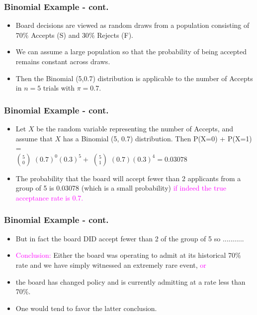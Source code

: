\documentclass[xcolor=dvipsnames,12pt]{beamer}
\begin{document}
\begin{frame}
\frametitle{Binomial Example - cont.}
\begin{itemize}
\item Board decisions are viewed as random draws from a
population consisting of $70\%$ Accepts (S) and $30\%$ Rejects (F).
\item We can assume a large population so that the probability of being
accepted remains constant across draws. 
\item Then the Binomial (5,0.7)
distribution is applicable to the number of Accepts in
$n=5$ trials with $\pi=0.7$.
\end{itemize}
\end{frame}


\begin{frame}
\frametitle{Binomial Example - cont.}
\begin{itemize}
\item Let $X$ be the random variable representing the number of Accepts,
and assume that $X$ has a Binomial (5, 0.7) distribution. Then
P(X=0) + P(X=1) =\\
${5}\choose{0}$ $(0.7)^0(0.3)^5+$ ${5}\choose{1}$ $(0.7)(0.3)^4=0.03078$
\item The probability that the board will accept fewer than 2 applicants
from a group of 5 is 0.03078 (which is a small probability)
\textcolor{magenta}{if indeed the true acceptance rate is 0.7.}
\end{itemize}
\end{frame}





\begin{frame}
\frametitle{Binomial Example - cont.}
\begin{itemize}
\item But in fact the board DID accept fewer than 2 of the group
of 5 so ...........
\item \textcolor{magenta}{Conclusion:}  Either the board was operating to admit
at its historical 70\% rate and we have simply witnessed an
extremely rare event, \textcolor{magenta}{or} 
\item  the board has changed policy and is currently admitting at
a rate less than 70\%. 
\item One would tend to favor the latter conclusion.
\end{itemize}
\end{frame}


\end{document}
